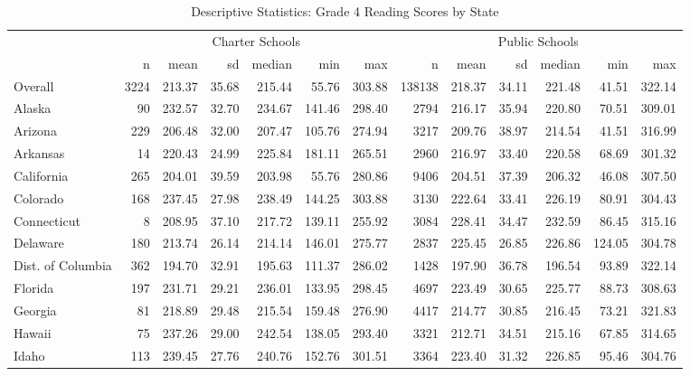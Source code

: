 \begin{sidewaystable}[htb]
\begin{center}
\caption{Descriptive Statistics: Grade 4 Reading Scores by State}
\label{g4readingdesc}
{\smaller
\begin{tabular}{lrrrrrr@{\extracolsep{10pt}}rrrrrr}
  \hline & \multicolumn{6}{c}{Charter Schools} & \multicolumn{6}{c}{Public Schools} \\ \cline{2-7} \cline{8-13} & n & mean & sd & median & min & max & n & mean & sd & median & min & max \\ 
  \hline
Overall & 3224 & 213.37 & 35.68 & 215.44 & 55.76 & 303.88 & 138138 & 218.37 & 34.11 & 221.48 & 41.51 & 322.14 \\ 
  Alaska &  90 & 232.57 & 32.70 & 234.67 & 141.46 & 298.40 & 2794 & 216.17 & 35.94 & 220.80 & 70.51 & 309.01 \\ 
  Arizona & 229 & 206.48 & 32.00 & 207.47 & 105.76 & 274.94 & 3217 & 209.76 & 38.97 & 214.54 & 41.51 & 316.99 \\ 
  Arkansas &  14 & 220.43 & 24.99 & 225.84 & 181.11 & 265.51 & 2960 & 216.97 & 33.40 & 220.58 & 68.69 & 301.32 \\ 
  California & 265 & 204.01 & 39.59 & 203.98 & 55.76 & 280.86 & 9406 & 204.51 & 37.39 & 206.32 & 46.08 & 307.50 \\ 
  Colorado & 168 & 237.45 & 27.98 & 238.49 & 144.25 & 303.88 & 3130 & 222.64 & 33.41 & 226.19 & 80.91 & 304.43 \\ 
  Connecticut &   8 & 208.95 & 37.10 & 217.72 & 139.11 & 255.92 & 3084 & 228.41 & 34.47 & 232.59 & 86.45 & 315.16 \\ 
  Delaware & 180 & 213.74 & 26.14 & 214.14 & 146.01 & 275.77 & 2837 & 225.45 & 26.85 & 226.86 & 124.05 & 304.78 \\ 
  Dist. of Columbia & 362 & 194.70 & 32.91 & 195.63 & 111.37 & 286.02 & 1428 & 197.90 & 36.78 & 196.54 & 93.89 & 322.14 \\ 
  Florida & 197 & 231.71 & 29.21 & 236.01 & 133.95 & 298.45 & 4697 & 223.49 & 30.65 & 225.77 & 88.73 & 308.63 \\ 
  Georgia &  81 & 218.89 & 29.48 & 215.54 & 159.48 & 276.90 & 4417 & 214.77 & 30.85 & 216.45 & 73.21 & 321.83 \\ 
  Hawaii &  75 & 237.26 & 29.00 & 242.54 & 138.05 & 293.40 & 3321 & 212.71 & 34.51 & 215.16 & 67.85 & 314.65 \\ 
  Idaho & 113 & 239.45 & 27.76 & 240.76 & 152.76 & 301.51 & 3364 & 223.40 & 31.32 & 226.85 & 95.46 & 304.76 \\ 

\end{tabular}}
\end{center}
\end{sidewaystable}

